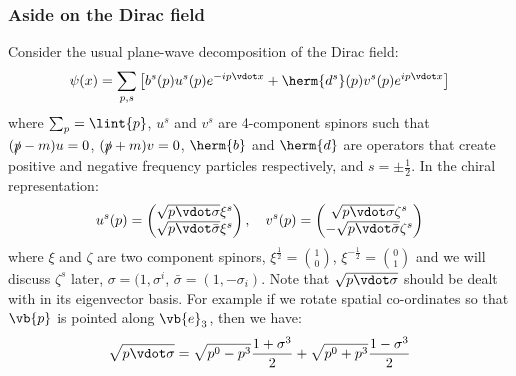 \documentclass{jknotes}
\begin{document}
\subsubsection*{Aside on the Dirac field}
Consider the usual plane-wave decomposition of the Dirac field:
\begin{equation}
    \psi(x) = \sum_{p,s}\left[ b^s(p)u^s(p)e^{-ip\vdot x} + \herm{d^s}(p)v^s(p)e^{ip\vdot x}\right]
\end{equation}
where \(\sum_p = \lint{p}\), \(u^s\) and \(v^s\) are 4-component spinors such that \((\slashed{p}-m)u = 0\), \((\slashed{p}+m)v = 0\), \(\herm{b}\) and \(\herm{d}\) are operators that create positive and negative frequency particles respectively, and \(s = \pm\frac{1}{2}\). In the chiral representation:
\begin{equation}
    u^s(p) = 
    \begin{pmatrix}
        \sqrt{p\vdot\sigma} \xi^s \\ \sqrt{p\vdot\bar{\sigma}} \xi^s
    \end{pmatrix}
    ,\quad
    v^s(p) = 
    \begin{pmatrix}
        \sqrt{p\vdot\sigma} \zeta^s \\ -\sqrt{p\vdot\bar{\sigma}} \zeta^s
    \end{pmatrix}
\end{equation}
where \(\xi\) and \(\zeta\) are two component spinors, \(\xi^{\frac{1}{2}} = {1 \choose 0}\), \(\xi^{-\frac{1}{2}} = {0 \choose 1}\) and we will discuss \(\zeta^s\) later, \(\sigma = (1,\sigma^i\), \(\bar{\sigma} = (1,-\sigma_i)\). Note that \(\sqrt{p\vdot\sigma}\) should be dealt with in its eigenvector basis. For example if we rotate spatial co-ordinates so that \(\vb{p}\) is pointed along \(\vb{e}_3\), then we have:
\begin{equation}
    \sqrt{p\vdot\sigma} = \sqrt{p^0-p^3}\frac{1+\sigma^3}{2} + \sqrt{p^0+p^3}\frac{1-\sigma^3}{2}
\end{equation}
\end{document}
